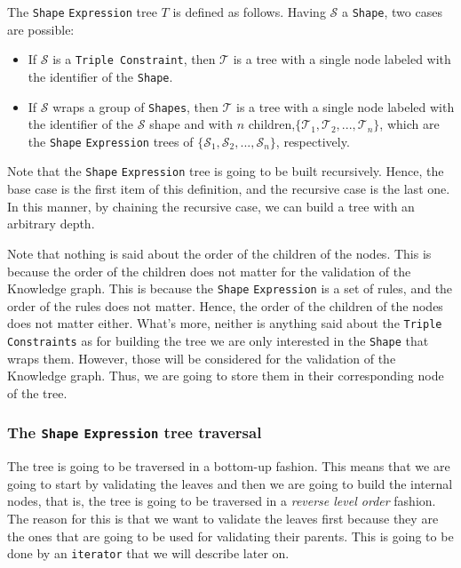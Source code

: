 \begin{definition}
    The \texttt{Shape} \texttt{Expression} tree $T$ is defined as follows. Having $\mathcal{S}$ a \texttt{Shape}, two cases are possible:

    \begin{itemize}
        \itemsep0.5em
        \item If $\mathcal{S}$ is a \texttt{Triple Constraint}, then $\mathcal{T}$ is a tree with a single node labeled with the identifier of the \texttt{Shape}.
        \item If $\mathcal{S}$ wraps a group of \texttt{Shapes}, then $\mathcal{T}$ is a tree with a single node labeled with the identifier of the $\mathcal{S}$ shape and with $n$ children,$\{\mathcal{T}_1, \mathcal{T}_2, ..., \mathcal{T}_n\}$, which are the \texttt{Shape} \texttt{Expression} trees of $\{\mathcal{S}_1, \mathcal{S}_2, ..., \mathcal{S}_n\}$, respectively.
    \end{itemize}

    Note that the \texttt{Shape} \texttt{Expression} tree is going to be built recursively. Hence, the base case is the first item of this definition, and the recursive case is the last one. In this manner, by chaining the recursive case, we can build a tree with an arbitrary depth.
\end{definition}

\begin{example}

\end{example}

Note that nothing is said about the order of the children of the nodes. This is because the order of the children does not matter for the validation of the Knowledge graph. This is because the \texttt{Shape} \texttt{Expression} is a set of rules, and the order of the rules does not matter. Hence, the order of the children of the nodes does not matter either. What's more, neither is anything said about the \texttt{Triple Constraints} as for building the tree we are only interested in the \texttt{Shape} that wraps them. However, those will be considered for the validation of the Knowledge graph. Thus, we are going to store them in their corresponding node of the tree.

\subsubsection{The \texttt{Shape} \texttt{Expression} tree traversal}

The tree is going to be traversed in a bottom-up fashion. This means that we are going to start by validating the leaves and then we are going to build the internal nodes, that is, the tree is going to be traversed in a \textit{reverse level order} fashion. The reason for this is that we want to validate the leaves first because they are the ones that are going to be used for validating their parents. This is going to be done by an \texttt{iterator} that we will describe later on.

